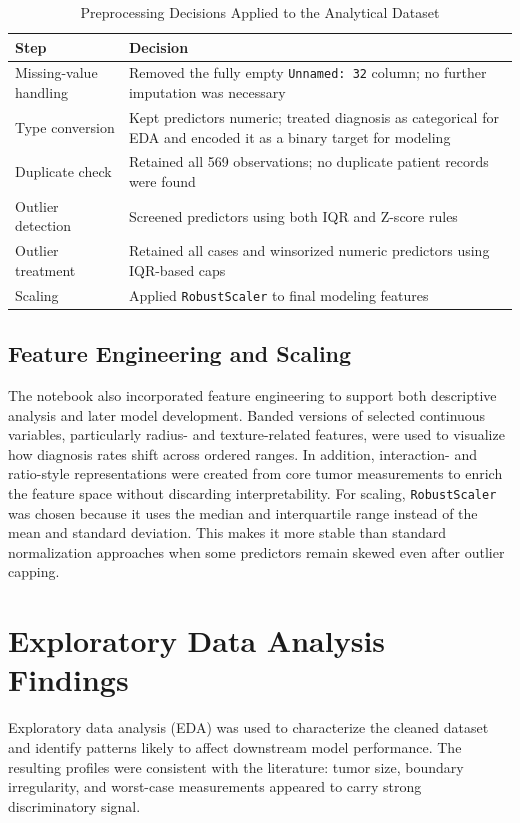 \documentclass[conference]{IEEEtran}
\begin{document}
\begin{table}[htbp]
\caption{Preprocessing Decisions Applied to the Analytical Dataset}
\label{tab:preprocessing_summary}
\centering
\footnotesize
\begin{tabularx}{\columnwidth}{>{\raggedright\arraybackslash}p{}X}
\toprule
\textbf{Step} & \textbf{Decision} \\
\midrule
Missing-value handling & Removed the fully empty \texttt{Unnamed: 32} column; no further imputation was necessary \\
Type conversion & Kept predictors numeric; treated diagnosis as categorical for EDA and encoded it as a binary target for modeling \\
Duplicate check & Retained all 569 observations; no duplicate patient records were found \\
Outlier detection & Screened predictors using both IQR and Z-score rules \\
Outlier treatment & Retained all cases and winsorized numeric predictors using IQR-based caps \\
Scaling & Applied \texttt{RobustScaler} to final modeling features \\
\bottomrule
\end{tabularx}
\end{table}

\subsection{Feature Engineering and Scaling}
The notebook also incorporated feature engineering to support both descriptive analysis and later model development. Banded versions of selected continuous variables, particularly radius- and texture-related features, were used to visualize how diagnosis rates shift across ordered ranges. In addition, interaction- and ratio-style representations were created from core tumor measurements to enrich the feature space without discarding interpretability. For scaling, \texttt{RobustScaler} was chosen because it uses the median and interquartile range instead of the mean and standard deviation. This makes it more stable than standard normalization approaches when some predictors remain skewed even after outlier capping.

\section{Exploratory Data Analysis Findings}
Exploratory data analysis (EDA) was used to characterize the cleaned dataset and identify patterns likely to affect downstream model performance. The resulting profiles were consistent with the literature: tumor size, boundary irregularity, and worst-case measurements appeared to carry strong discriminatory signal.
\end{document}

